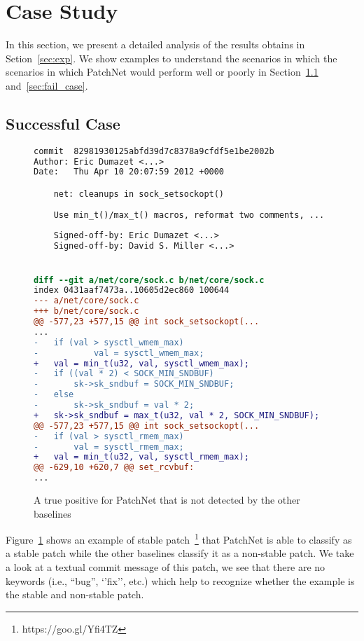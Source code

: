 \section{Case Study}
\label{sec:case_study}
In this section, we present a detailed analysis of the results obtains in Setion~\ref{sec:exp}. We show examples to understand the scenarios in which the scenarios in which PatchNet would perform well or poorly in Section~\ref{sec:good_case} and~\ref{sec:fail_case}. 

\subsection{Successful Case}
\label{sec:good_case}

\begin{figure}[t!]
\begin{lstlisting}[language=diff]
commit 	82981930125abfd39d7c8378a9cfdf5e1be2002b
Author: Eric Dumazet <...>
Date:   Thu Apr 10 20:07:59 2012 +0000

    net: cleanups in sock_setsockopt()
    
    Use min_t()/max_t() macros, reformat two comments, ... 
    
    Signed-off-by: Eric Dumazet <...>
    Signed-off-by: David S. Miller <...>


diff --git a/net/core/sock.c b/net/core/sock.c
index 0431aaf7473a..10605d2ec860 100644
--- a/net/core/sock.c
+++ b/net/core/sock.c
@@ -577,23 +577,15 @@ int sock_setsockopt(...
...
-	if (val > sysctl_wmem_max)
-   		val = sysctl_wmem_max;
+	val = min_t(u32, val, sysctl_wmem_max);   
-	if ((val * 2) < SOCK_MIN_SNDBUF)
-		sk->sk_sndbuf = SOCK_MIN_SNDBUF;
-	else
-		sk->sk_sndbuf = val * 2;
+	sk->sk_sndbuf = max_t(u32, val * 2, SOCK_MIN_SNDBUF);
@@ -577,23 +577,15 @@ int sock_setsockopt(...
-	if (val > sysctl_rmem_max)
-		val = sysctl_rmem_max;
+	val = min_t(u32, val, sysctl_rmem_max);
@@ -629,10 +620,7 @@ set_rcvbuf:
...
\end{lstlisting}\vspace{-0.4cm}
\caption{A true positive for PatchNet that is not detected by the other
  baselines}
\label{fig:good_case}\vspace{-0.4cm}
\end{figure}

Figure~\ref{fig:good_case} shows an example of stable patch~\footnote{https://goo.gl/Yfi4TZ} that PatchNet is able to classify as a stable patch while the other baselines classify it as a non-stable patch. We take a look at a textual commit message of this patch, we see that there are no keywords (i.e., ``bug'', `'fix'', etc.) which help to recognize whether the example is the stable and non-stable patch. 

